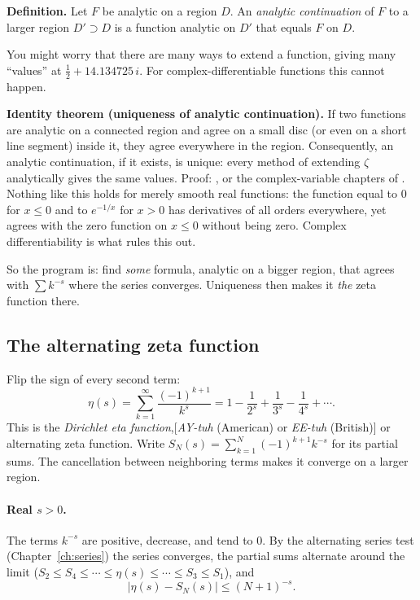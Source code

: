 \textbf{Definition.} Let $F$ be analytic on a region $D$. An \emph{analytic continuation} of $F$ to a larger region $D'\supset D$ is a function analytic on $D'$ that equals $F$ on $D$.

You might worry that there are many ways to extend a function, giving many ``values'' at $\tfrac12+14.134725\,i$. For complex-differentiable functions this cannot happen.

\begin{beyond}
\textbf{Identity theorem (uniqueness of analytic continuation).} If two functions are analytic on a connected region and agree on a small disc (or even on a short line segment) inside it, they agree everywhere in the region. Consequently, an analytic continuation, if it exists, is unique: every method of extending $\zeta$ analytically gives the same values. Proof: \cite{titchmarsh}, or the complex-variable chapters of \cite{rhb}. Nothing like this holds for merely smooth real functions: the function equal to $0$ for $x\le0$ and to $e^{-1/x}$ for $x>0$ has derivatives of all orders everywhere, yet agrees with the zero function on $x\le0$ without being zero. Complex differentiability is what rules this out.
\end{beyond}

So the program is: find \emph{some} formula, analytic on a bigger region, that agrees with $\sum k^{-s}$ where the series converges. Uniqueness then makes it \emph{the} zeta function there.

\subsection{The alternating zeta function}

Flip the sign of every second term:
\begin{equation}
\eta(s)=\sum_{k=1}^{\infty}\frac{(-1)^{k+1}}{k^s}=1-\frac1{2^s}+\frac1{3^s}-\frac1{4^s}+\cdots .
\label{eq:zeta-eta}
\end{equation}
This is the \emph{Dirichlet eta function},[\emph{AY-tuh} (American) or \emph{EE-tuh} (British)] or alternating zeta function. Write $S_N(s)=\sum_{k=1}^{N}(-1)^{k+1}k^{-s}$ for its partial sums. The cancellation between neighboring terms makes it converge on a larger region.

\paragraph{Real $s>0$.} The terms $k^{-s}$ are positive, decrease, and tend to $0$. By the alternating series test (Chapter~\ref{ch:series}) the series converges, the partial sums alternate around the limit ($S_2\le S_4\le\cdots\le\eta(s)\le\cdots\le S_3\le S_1$), and
\[
|\eta(s)-S_N(s)|\le(N+1)^{-s}.
\]

